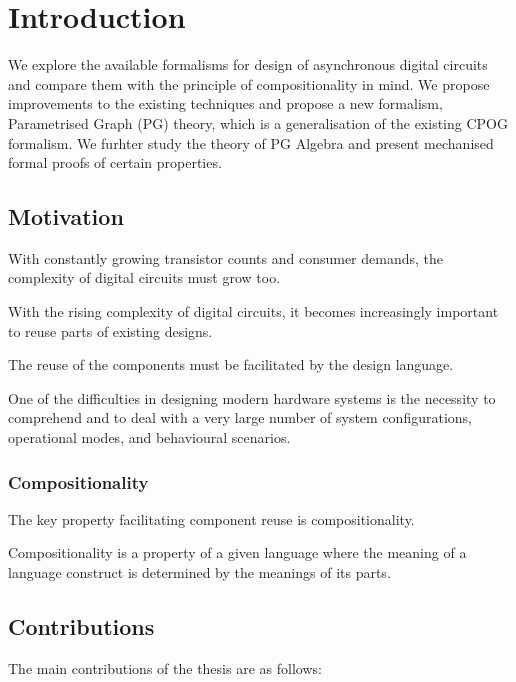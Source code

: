 
\chapter{Introduction}

We explore the available formalisms for design of asynchronous digital
circuits and compare them with the principle of compositionality in
mind. We propose improvements to the existing techniques and
propose a new formalism, Parametrised Graph (PG) theory, which is a
generalisation of the existing CPOG formalism. We furhter study 
the theory of PG Algebra and present mechanised formal proofs of certain properties.


\section{Motivation}

With constantly growing transistor counts and consumer demands, the complexity of digital circuits must grow too.

With the rising complexity of digital circuits, it becomes increasingly important to reuse parts of existing designs.

The reuse of the components must be facilitated by the design language.

One of the difficulties in designing modern hardware systems is the
necessity to comprehend and to deal with a very large number of system
configurations, operational modes, and behavioural scenarios. 

\subsection{Compositionality}

The key property facilitating component reuse is compositionality.

Compositionality is a property of a given language where the meaning of a language construct is determined by the meanings of its parts.


\section{Contributions}

The main contributions of the thesis are as follows:

